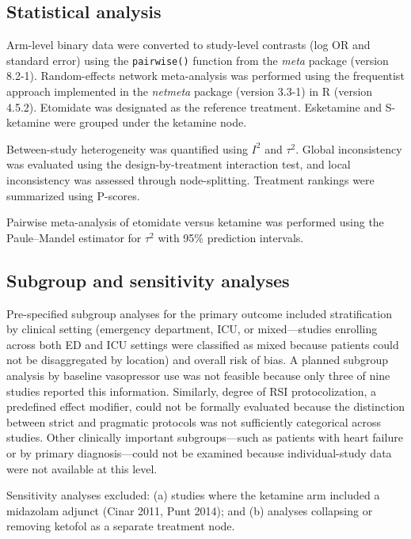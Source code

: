 \documentclass[11pt]{article}
\begin{document}
\subsection{Statistical analysis}

Arm-level binary data were converted to study-level contrasts (log OR and standard error) using the \texttt{pairwise()} function from the \textit{meta} package (version 8.2-1).\cite{balduzzi2019} Random-effects network meta-analysis was performed using the frequentist approach implemented in the \textit{netmeta} package (version 3.3-1)\cite{rucker2020} in R (version 4.5.2). Etomidate was designated as the reference treatment. Esketamine and S-ketamine were grouped under the ketamine node.

Between-study heterogeneity was quantified using $I^2$ and $\tau^2$. Global inconsistency was evaluated using the design-by-treatment interaction test, and local inconsistency was assessed through node-splitting. Treatment rankings were summarized using P-scores.\cite{rucker2015}

Pairwise meta-analysis of etomidate versus ketamine was performed using the Paule--Mandel estimator for $\tau^2$ with 95\% prediction intervals.

\subsection{Subgroup and sensitivity analyses}

Pre-specified subgroup analyses for the primary outcome included stratification by clinical setting (emergency department, ICU, or mixed---studies enrolling across both ED and ICU settings were classified as mixed because patients could not be disaggregated by location) and overall risk of bias. A planned subgroup analysis by baseline vasopressor use was not feasible because only three of nine studies reported this information. Similarly, degree of RSI protocolization, a predefined effect modifier, could not be formally evaluated because the distinction between strict and pragmatic protocols was not sufficiently categorical across studies. Other clinically important subgroups---such as patients with heart failure or by primary diagnosis---could not be examined because individual-study data were not available at this level.

Sensitivity analyses excluded: (a) studies where the ketamine arm included a midazolam adjunct (Cinar 2011,\cite{cinar2011} Punt 2014\cite{punt2014}); and (b) analyses collapsing or removing ketofol as a separate treatment node.
\end{document}
